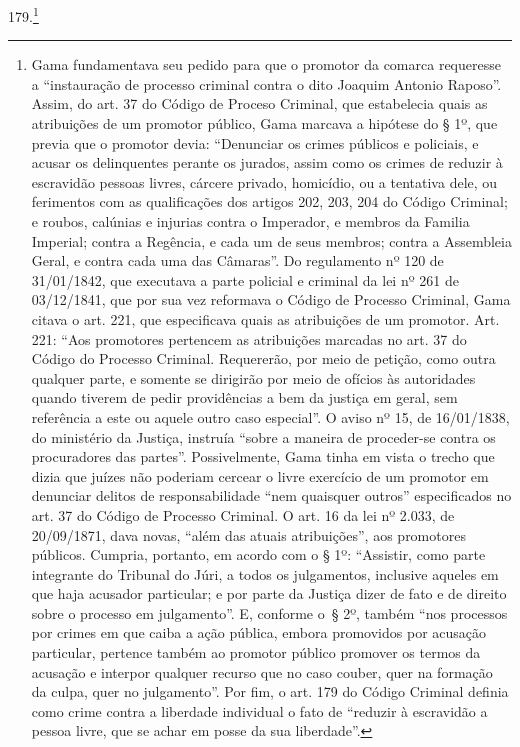 179.\footnote{Gama fundamentava seu pedido para que o promotor da
  comarca requeresse a ``instauração de processo criminal contra o dito
  Joaquim Antonio Raposo''. Assim, do art. 37 do Código de Proceso
  Criminal, que estabelecia quais as atribuições de um promotor público,
  Gama marcava a hipótese do § 1º, que previa que o promotor devia:
  ``Denunciar os crimes públicos e policiais, e acusar os delinquentes
  perante os jurados, assim como os crimes de reduzir à escravidão
  pessoas livres, cárcere privado, homicídio, ou a tentativa dele, ou
  ferimentos com as qualificações dos artigos 202, 203, 204 do Código
  Criminal; e roubos, calúnias e injurias contra o Imperador, e membros
  da Familia Imperial; contra a Regência, e cada um de seus membros;
  contra a Assembleia Geral, e contra cada uma das Câmaras''. Do
  regulamento nº 120 de 31/01/1842, que executava a parte policial e
  criminal da lei nº 261 de 03/12/1841, que por sua vez reformava o
  Código de Processo Criminal, Gama citava o art. 221, que especificava
  quais as atribuições de um promotor. Art. 221: ``Aos promotores
  pertencem as atribuições marcadas no art. 37 do Código do Processo
  Criminal. Requererão, por meio de petição, como outra qualquer parte,
  e somente se dirigirão por meio de ofícios às autoridades quando
  tiverem de pedir providências a bem da justiça em geral, sem
  referência a este ou aquele outro caso especial''. O aviso nº 15, de
  16/01/1838, do ministério da Justiça, instruía ``sobre a maneira de
  proceder-se contra os procuradores das partes''. Possivelmente, Gama
  tinha em vista o trecho que dizia que juízes não poderiam cercear o
  livre exercício de um promotor em denunciar delitos de
  responsabilidade ``nem quaisquer outros'' especificados no art. 37 do
  Código de Processo Criminal. O art. 16 da lei nº 2.033, de 20/09/1871,
  dava novas, ``além das atuais atribuições'', aos promotores públicos.
  Cumpria, portanto, em acordo com o § 1º: ``Assistir, como parte
  integrante do Tribunal do Júri, a todos os julgamentos, inclusive
  aqueles em que haja acusador particular; e por parte da Justiça dizer
  de fato e de direito sobre o processo em julgamento''. E, conforme o~§
  2º, também ``nos processos por crimes em que caiba a ação pública,
  embora promovidos por acusação particular, pertence também ao promotor
  público promover os termos da acusação e interpor qualquer recurso que
  no caso couber, quer na formação da culpa, quer no julgamento''. Por
  fim, o art. 179 do Código Criminal definia como crime contra a
  liberdade individual o fato de ``reduzir à escravidão a pessoa livre,
  que se achar em posse da sua liberdade''.}

